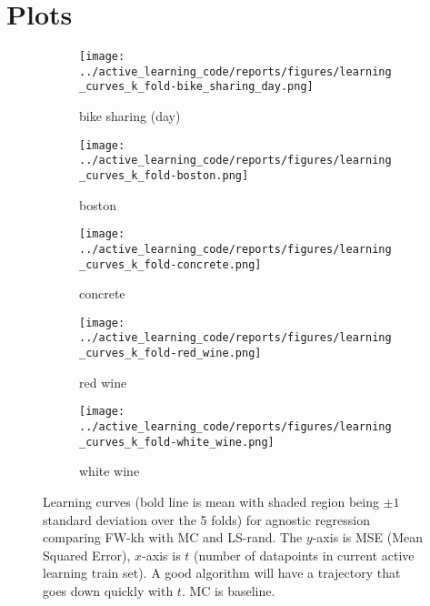 \section{Plots}
\begin{figure}[htb]
  \label{figs:agnostic-regression-learning-curves}
  \centering
  \begin{subfigure}[b]{0.48\textwidth}
    \label{fig:learning-curve-agnostic-bike-sharing}
    \texttt{[image: ../active\_learning\_code/reports/figures/learning\_curves\_k\_fold-bike\_sharing\_day.png]}
    \caption{bike sharing (day)}
  \end{subfigure}
  \begin{subfigure}[b]{0.48\textwidth}
    \label{fig:learning-curve-agnostic-boston}
    \texttt{[image: ../active\_learning\_code/reports/figures/learning\_curves\_k\_fold-boston.png]}
    \caption{boston}
  \end{subfigure}
  \hspace{1.0cm}
  \begin{subfigure}[b]{0.48\textwidth}
    \label{fig:learning-curve-agnostic-concrete}
    \texttt{[image: ../active\_learning\_code/reports/figures/learning\_curves\_k\_fold-concrete.png]}
    \caption{concrete}
  \end{subfigure}
  \begin{subfigure}[b]{0.48\textwidth}
    \label{fig:learning-curve-agnostic-red_whine}
    \texttt{[image: ../active\_learning\_code/reports/figures/learning\_curves\_k\_fold-red\_wine.png]}
    \caption{red wine}
  \end{subfigure}
  \hspace{1.0cm}
  \begin{subfigure}[b]{0.48\textwidth}
    \label{fig:learning-curve-agnostic-white_wine}
    \texttt{[image: ../active\_learning\_code/reports/figures/learning\_curves\_k\_fold-white\_wine.png]}
    \caption{white wine}
  \end{subfigure}
  \caption{Learning curves (bold line is mean with shaded region being \(\pm 1\) standard deviation over the 5 folds) for agnostic regression comparing FW-kh with MC and
    LS-rand. The \(y\)-axis is MSE (Mean Squared Error), \(x\)-axis is \(t\)
    (number of datapoints in current active learning train set). A good
    algorithm will have a trajectory that goes down quickly with \(t\). MC is baseline.}
\end{figure}

